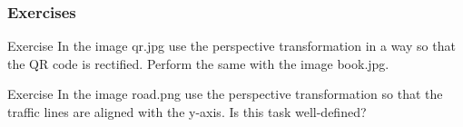\documentclass{beamer}
\begin{document}
\begin{frame}
\frametitle{Exercises}
\begin{block}{Exercise}
In the image qr.jpg use the perspective transformation in a way so that the QR code is rectified. Perform the same with the image book.jpg.
\end{block}

\begin{block}{Exercise}
In the image road.png use the perspective transformation so that the traffic lines are aligned with the y-axis. Is this task well-defined?
\end{block}
\end{frame}
\end{document}
